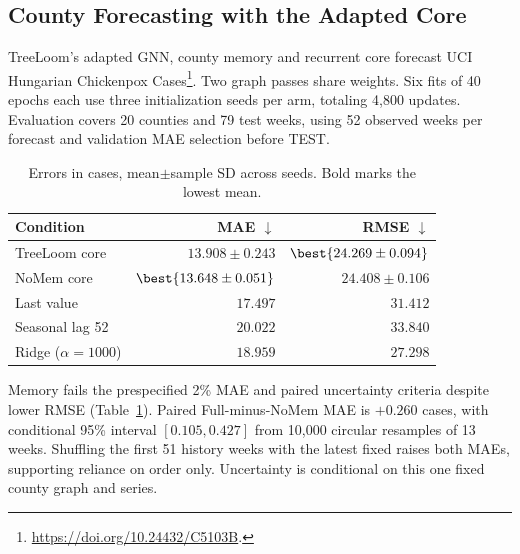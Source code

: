 \subsection{County Forecasting with the Adapted Core}
\label{app:countyforecasting}
TreeLoom's adapted GNN, county memory and recurrent core forecast UCI Hungarian Chickenpox Cases\footnote{\url{https://doi.org/10.24432/C5103B}.}. Two graph passes share weights. Six fits of 40 epochs each use three initialization seeds per arm, totaling 4,800 updates. Evaluation covers 20 counties and 79 test weeks, using 52 observed weeks per forecast and validation MAE selection before TEST.

\begin{table}[!htbp]
\centering
\small
\begin{tabular}{@{}lrr@{}}
\toprule
Condition & MAE $\downarrow$ & RMSE $\downarrow$\\
\midrule
TreeLoom core &$13.908\pm0.243$&$\best{24.269\pm0.094}$\\
NoMem core &$\best{13.648\pm0.051}$&$24.408\pm0.106$\\
Last value &$17.497$&$31.412$\\
Seasonal lag 52 &$20.022$&$33.840$\\
Ridge ($\alpha=1000$) &$18.959$&$27.298$\\
\bottomrule
\end{tabular}
\caption{Errors in cases, mean$\pm$sample SD across seeds. Bold marks the lowest mean.}
\label{tab:countyforecasting}
\end{table}

Memory fails the prespecified 2\% MAE and paired uncertainty criteria despite lower RMSE (Table~\ref{tab:countyforecasting}). Paired Full-minus-NoMem MAE is $+0.260$ cases, with conditional 95\% interval $[0.105,0.427]$ from 10,000 circular resamples of 13 weeks. Shuffling the first 51 history weeks with the latest fixed raises both MAEs, supporting reliance on order only. Uncertainty is conditional on this one fixed county graph and series.


